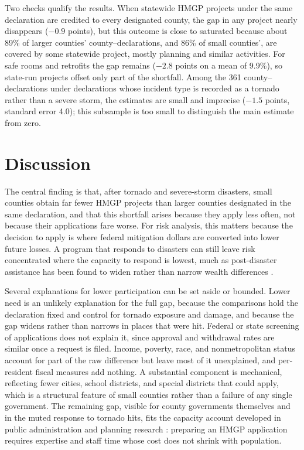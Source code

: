 \documentclass[12pt]{article}
\begin{document}
Two checks qualify the results. When statewide HMGP projects under the same declaration are credited to every designated county, the gap in any project nearly disappears ($-0.9$ points), but this outcome is close to saturated because about 89\% of larger counties' county--declarations, and 86\% of small counties', are covered by some statewide project, mostly planning and similar activities. For safe rooms and retrofits the gap remains ($-2.8$ points on a mean of 9.9\%), so state-run projects offset only part of the shortfall. Among the 361 county--declarations under declarations whose incident type is recorded as a tornado rather than a severe storm, the estimates are small and imprecise ($-1.5$ points, standard error 4.0); this subsample is too small to distinguish the main estimate from zero.

\section{Discussion}

The central finding is that, after tornado and severe-storm disasters, small counties obtain far fewer HMGP projects than larger counties designated in the same declaration, and that this shortfall arises because they apply less often, not because their applications fare worse. For risk analysis, this matters because the decision to apply is where federal mitigation dollars are converted into lower future losses. A program that responds to disasters can still leave risk concentrated where the capacity to respond is lowest, much as post-disaster assistance has been found to widen rather than narrow wealth differences \parencite{howell2019damages}.

Several explanations for lower participation can be set aside or bounded. Lower need is an unlikely explanation for the full gap, because the comparisons hold the declaration fixed and control for tornado exposure and damage, and because the gap widens rather than narrows in places that were hit. Federal or state screening of applications does not explain it, since approval and withdrawal rates are similar once a request is filed. Income, poverty, race, and nonmetropolitan status account for part of the raw difference but leave most of it unexplained, and per-resident fiscal measures add nothing. A substantial component is mechanical, reflecting fewer cities, school districts, and special districts that could apply, which is a structural feature of small counties rather than a failure of any single government. The remaining gap, visible for county governments themselves and in the muted response to tornado hits, fits the capacity account developed in public administration and planning research \parencite{collins2006redistributive,hall2008grant,lyles2014planners,smith2025rural}: preparing an HMGP application requires expertise and staff time whose cost does not shrink with population.
\end{document}
